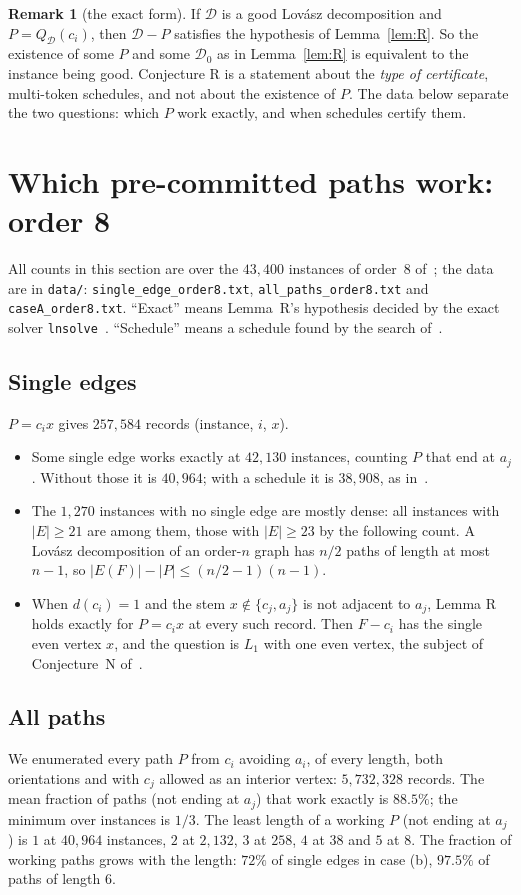 \documentclass[11pt]{amsart}
\theoremstyle{definition}
\newtheorem{remark}[theorem]{Remark}
\newcommand{\cD}{\mathcal D}
\begin{document}
\begin{remark}[the exact form]\label{rem:exact}
If $\cD$ is a good Lov\'asz decomposition and $P=Q_\cD(c_i)$, then $\cD-P$ satisfies the hypothesis of
Lemma~\ref{lem:R}. So the existence of some $P$ and some $\cD_0$ as in Lemma~\ref{lem:R} is
equivalent to the instance being good. Conjecture R is a statement about the \emph{type of
certificate}, multi-token schedules, and not about the existence of $P$. The data below separate the
two questions: which $P$ work exactly, and when schedules certify them.
\end{remark}

\section{Which pre-committed paths work: order 8}\label{sec:data}

All counts in this section are over the $43{,}400$ instances of order~$8$ of~\cite{LN}; the data are
in \texttt{data/}: \texttt{single\_edge\_order8.txt}, \texttt{all\_paths\_order8.txt} and
\texttt{caseA\_order8.txt}. ``Exact'' means Lemma~R's hypothesis decided by the exact solver
\texttt{lnsolve}~\cite{LN}. ``Schedule'' means a schedule found by the search of~\cite{LN}.

\subsection*{Single edges}
$P=c_ix$ gives $257{,}584$ records (instance, $i$, $x$).
\begin{itemize}
\item Some single edge works exactly at $42{,}130$ instances, counting $P$ that end at $a_j$. Without
those it is $40{,}964$; with a schedule it is $38{,}908$, as in~\cite{LN}.
\item The $1{,}270$ instances with no single edge are mostly dense: all instances with $|E|\ge21$
are among them, those with $|E|\ge23$ by the following count. A Lov\'asz decomposition of an order-$n$ graph has $n/2$ paths of length at most $n-1$,
so $|E(F)|-|P|\le(n/2-1)(n-1)$.
\item When $d(c_i)=1$ and the stem $x\notin\{c_j,a_j\}$ is not adjacent to $a_j$, Lemma R holds exactly for
$P=c_ix$ at every such record. Then $F-c_i$ has the single even vertex $x$, and the question is
$L_1$ with one even vertex, the subject of Conjecture~N of~\cite{TRN}.
\end{itemize}

\subsection*{All paths}
We enumerated every path $P$ from $c_i$ avoiding $a_i$, of every length, both orientations and with
$c_j$ allowed as an interior vertex: $5{,}732{,}328$ records. The mean fraction of paths (not ending at $a_j$) that work exactly is
$88.5\%$; the minimum over instances is $1/3$. The least length of a working $P$ (not ending at $a_j$) is
$1$ at $40{,}964$ instances, $2$ at $2{,}132$, $3$ at $258$, $4$ at $38$ and $5$ at $8$. The fraction
of working paths grows with the length: $72\%$ of single edges in case (b), $97.5\%$ of paths of
length $6$.
\end{document}

